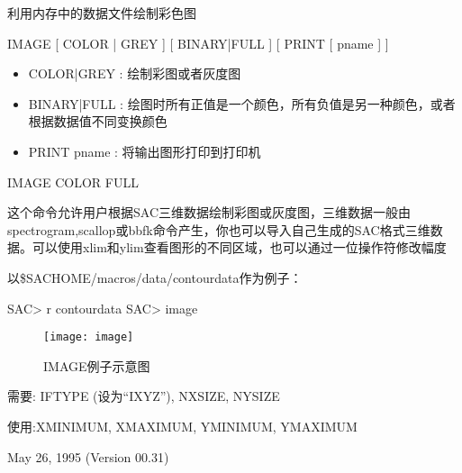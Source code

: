 \label{cmd:image}

利用内存中的数据文件绘制彩色图

IMAGE [ COLOR | GREY ] [ BINARY|FULL ] [ PRINT [ pname ] ]

\begin{itemize}
\item COLOR|GREY :  绘制彩图或者灰度图
\item BINARY|FULL :  绘图时所有正值是一个颜色，所有负值是另一种颜色，或者根据数据值不同变换颜色 
\item PRINT pname : 将输出图形打印到打印机 
\end{itemize}

IMAGE COLOR FULL

这个命令允许用户根据SAC三维数据绘制彩图或灰度图，三维数据一般由spectrogram,scallop或bbfk命令产生，你也可以导入自己生成的SAC格式三维数据。可以使用xlim和ylim查看图形的不同区域，也可以通过一位操作符修改幅度

以\${SACHOME}/macros/data/contourdata作为例子：
\begin{SACCode}
SAC> r contourdata
SAC> image
\end{SACCode}

\begin{figure}[h]
\centering
\texttt{[image: image]}
\caption{IMAGE例子示意图}
\end{figure}

需要:  IFTYPE (设为``IXYZ''), NXSIZE, NYSIZE

使用:XMINIMUM, XMAXIMUM, YMINIMUM, YMAXIMUM

May 26, 1995 (Version 00.31)
